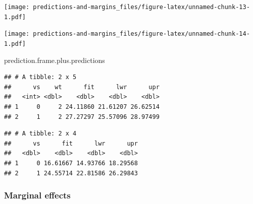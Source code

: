 \documentclass[]{article}
\newenvironment{Shaded}{\begin{snugshade}}{\end{snugshade}}
\newcommand{\KeywordTok}[1]{\textcolor[rgb]{0.13,0.29,0.53}{\textbf{#1}}}
\newcommand{\DataTypeTok}[1]{\textcolor[rgb]{0.13,0.29,0.53}{#1}}
\newcommand{\StringTok}[1]{\textcolor[rgb]{0.31,0.60,0.02}{#1}}
\newcommand{\OperatorTok}[1]{\textcolor[rgb]{0.81,0.36,0.00}{\textbf{#1}}}
\newcommand{\NormalTok}[1]{#1}
\theoremstyle{definition}
\theoremstyle{definition}
\theoremstyle{definition}
\theoremstyle{remark}
\begin{document}
\texttt{[image: predictions-and-margins\_files/figure-latex/unnamed-chunk-13-1.pdf]}

\begin{Shaded}
\end{Shaded}

\texttt{[image: predictions-and-margins\_files/figure-latex/unnamed-chunk-14-1.pdf]}

\begin{Shaded}
\begin{Highlighting}[]
\NormalTok{prediction.frame.plus.predictions}
\end{Highlighting}
\end{Shaded}

\begin{verbatim}
## # A tibble: 2 x 5
##      vs    wt      fit      lwr      upr
##   <int> <dbl>    <dbl>    <dbl>    <dbl>
## 1     0     2 24.11860 21.61207 26.62514
## 2     1     2 27.27297 25.57096 28.97499
\end{verbatim}

\begin{Shaded}
\end{Shaded}

\begin{verbatim}
## # A tibble: 2 x 4
##      vs      fit      lwr      upr
##   <dbl>    <dbl>    <dbl>    <dbl>
## 1     0 16.61667 14.93766 18.29568
## 2     1 24.55714 22.81586 26.29843
\end{verbatim}

\subsubsection*{Marginal effects}\label{marginal-effects}
\end{document}
